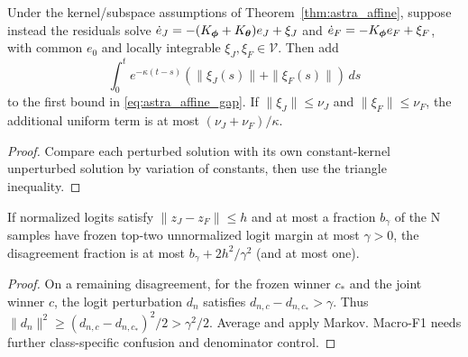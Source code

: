 \begin{proposition}
\label{prop:astra_robust}
Under the kernel/subspace assumptions of Theorem~\ref{thm:astra_affine},
suppose instead the residuals solve
$\dot e_J=-(K_{\boldsymbol{\phi}}+K_{\boldsymbol{\theta}})e_J+\xi_J$ and
$\dot e_F=-K_{\boldsymbol{\phi}} e_F+\xi_F$, with common $e_0$ and locally
integrable $\xi_J,\xi_F\in\mathcal V$. Then add
\[
 \int_0^t e^{-\kappa(t-s)}(\|\xi_J(s)\|+\|\xi_F(s)\|)\,ds
\]
to the first bound in \eqref{eq:astra_affine_gap}. If
$\|\xi_J\|\le\nu_J$ and $\|\xi_F\|\le\nu_F$, the additional
uniform term is at most $(\nu_J+\nu_F)/\kappa$.
\end{proposition}
\begin{proof}
Compare each perturbed solution with its own constant-kernel unperturbed
solution by variation of constants, then use the triangle inequality.
\end{proof}

\begin{proposition}
\label{prop:astra_margins}
If normalized logits satisfy $\|z_J-z_F\|\le h$ and at most a fraction
$b_\gamma$ of the N samples have frozen top-two unnormalized logit
margin at most $\gamma>0$, the disagreement fraction is at most
$b_\gamma+2h^2/\gamma^2$ (and at most one).
\end{proposition}
\begin{proof}
On a remaining disagreement, for the frozen winner $c_*$ and the joint
winner $c$, the logit perturbation $d_n$ satisfies
$d_{n,c}-d_{n,c_*}>\gamma$. Thus
$\|d_n\|^2\ge(d_{n,c}-d_{n,c_*})^2/2>\gamma^2/2$.
Average and apply Markov. Macro-F1 needs further class-specific
confusion and denominator control.
\end{proof}
